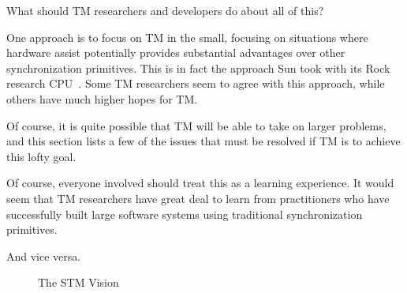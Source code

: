 What should TM researchers and developers do about all of this?

One approach is to focus on TM in the small, focusing on situations
where hardware assist potentially provides substantial advantages over
other synchronization primitives.
This is in fact the approach Sun took with its Rock research
CPU~\cite{DaveDice2009ASPLOSRockHTM}.
Some TM researchers seem to agree with this approach, while others have
much higher hopes for TM.

Of course, it is quite possible that TM will be able to take on larger
problems, and this section lists a few of the issues that
must be resolved if TM is to achieve this lofty goal.

Of course, everyone involved should treat this as a learning experience.
It would seem that TM researchers have great deal to learn from
practitioners who have successfully built large software systems using
traditional synchronization primitives.

And vice versa.

\begin{figure}[tb]
\centering
{}
\caption{The STM Vision}
\end{figure}

